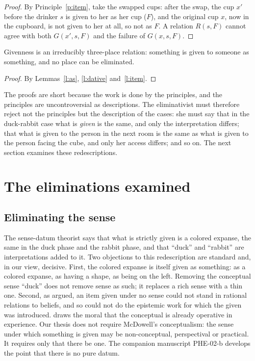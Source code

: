 \documentclass{situationist-preprint}
\begin{document}
\begin{proof}
By Principle~\ref{p:item}, take the swapped cups: after the swap, the cup $x'$ before the drinker $s$ is given to her as her cup ($F$), and the original cup $x$, now in the cupboard, is not given to her at all, so not as $F$. A relation $R(s,F)$ cannot agree with both $G(x',s,F)$ and the failure of $G(x,s,F)$.
\end{proof}

\begin{theorem}\label{t:main}
Givenness is an irreducibly three-place relation: something is given to someone as something, and no place can be eliminated.
\end{theorem}

\begin{proof}
By Lemmas~\ref{l:as}, \ref{l:dative} and~\ref{l:item}.
\end{proof}

The proofs are short because the work is done by the principles, and the principles are uncontroversial as descriptions. The eliminativist must therefore reject not the principles but the description of the cases: she must say that in the duck-rabbit case what is \emph{given} is the same, and only the interpretation differs; that what is given to the person in the next room is the same as what is given to the person facing the cube, and only her access differs; and so on. The next section examines these redescriptions.

\section{The eliminations examined}

\subsection{Eliminating the sense}

The sense-datum theorist says that what is strictly given is a colored expanse, the same in the duck phase and the rabbit phase, and that \enquote{duck} and \enquote{rabbit} are interpretations added to it. Two objections to this redescription are standard and, in our view, decisive. First, the colored expanse is itself given as something: as a colored expanse, as having a shape, as being on the left. Removing the conceptual sense \enquote{duck} does not remove sense as such; it replaces a rich sense with a thin one. Second, as \citet{Sellars1956} argued, an item given under no sense could not stand in rational relations to beliefs, and so could not do the epistemic work for which the given was introduced. \citet{McDowell1994} draws the moral that the conceptual is already operative in experience. Our thesis does not require McDowell's conceptualism: the sense under which something is given may be non-conceptual, perspectival or practical. It requires only that there be one. The companion manuscript PHE-02-b develops the point that there is no pure datum.
\end{document}
